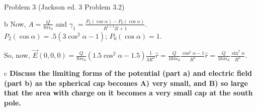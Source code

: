 \begin{homeworkProblem}{Problem 3 (Jackson ed. 3 Problem 3.2)}
\begin{homeworkSection}{b}
Now, $A = \frac{Q}{8\pi \epsilon_0}$ and $\gamma_1 = \frac{P_2(\cos\alpha)-P_0(\cos\alpha)}{R^{l+1}2l+1}$. \\
$P_2(\cos\alpha) = .5(3\cos^2\alpha-1)$; $P_0(\cos\alpha) = 1$. 

So, now, $\vec{E}(0,0,0)= \frac{Q}{8\pi \epsilon_0} (1.5 \cos^2\alpha - 1.5)\frac{1}{3R^2} \hat{r}= \frac{Q}{16\pi \epsilon_0} \frac{\cos^2\alpha - 1}{R^2} \hat{r} = \frac{Q}{16\pi \epsilon_0} \frac{\sin^2\alpha}{R^2}$.

\end{homeworkSection}

\begin{homeworkSection}{c}
\textbf{Discuss the limiting forms of the potential (part a) and electric field (part b) 
as the spherical cap becomes A) very small, and B) so large that the area with 
charge on it becomes a very small cap at the south pole.}

\end{homeworkSection}

\end{homeworkProblem}